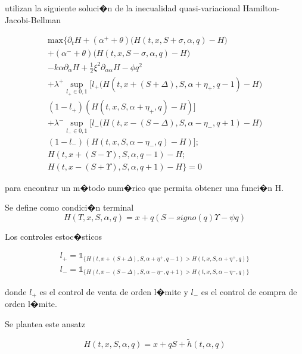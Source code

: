 \documentclass[12pt,a4paper,spanish]{article}%
\begin{document}
\cite{Cartea2019} utilizan la siguiente soluci�n de la inecualidad quasi-variacional Hamilton-Jacobi-Bellman 

\begin{gather}
	\text{max} \bigg\{
	\partial_t H
	+ (\alpha^+ + \theta) \big( H(t,x,S+\sigma,\alpha,q) - H \big) \nonumber \\
	+ (\alpha^- + \theta) \big( H(t,x,S-\sigma,\alpha,q) - H \big) \nonumber \\
	-k\alpha \partial_\alpha H + \frac{1}{2} \xi^2 \partial_{\alpha \alpha} H - \phi q^2 \nonumber \\
	+ \lambda^ + \sup_{l_+\in {0,1}} \bigg[l_+ \big( H(t,x + (S+\Delta),S,\alpha+\eta_+,q-1) - H \big) \nonumber \\
	(1-l_+) ( H(t,x,S,\alpha+\eta_+,q) - H )\bigg] \nonumber \\
	+ \lambda^ - \sup_{l_-\in {0,1}} \bigg[l_- \big( H(t,x - (S-\Delta),S,\alpha-\eta_-,q+1) - H \big) \nonumber \\
	(1-l_-) ( H(t,x,S,\alpha-\eta_-,q) - H )\bigg]; \nonumber \\
	H(t,x+(S-\Upsilon),S,\alpha,q-1)-H; \nonumber \\
	H(t,x-(S+\Upsilon),S,\alpha,q+1)-H		 	
\bigg\}=0
\label{HJB}	
\end{gather}

para encontrar un m�todo num�rico que permita obtener una funci�n H. 


Se define como condici�n terminal
\begin{equation}
H(T,x,S,\alpha,q) = x + q (S-\textit{signo}(q)\Upsilon - \psi q)
\label{terminal}
\end{equation}

Los controles estoc�sticos 

\begin{gather}
	\nonumber l_+ = \mathds{1}_{\{H(t,x+(S+\Delta),S,\alpha+\eta^+,q-1)>H(t,x,S,\alpha+\eta^+,q)\}}\\
	l_-=\mathds{1}_{\{H(t,x-(S-\Delta),S,\alpha-\eta^-,q+1)>H(t,x,S,\alpha-\eta^-,q)\}} 
	\label{l}
\end{gather}


donde $l_+$ es el control de venta de orden l�mite y $l_-$ es el control de compra de orden l�mite.


Se plantea este ansatz

\begin{equation}
	H(t,x,S,\alpha,q)=x+qS+\tilde{h}(t,\alpha,q)
	\label{ansatz}
\end{equation}
\end{document}
